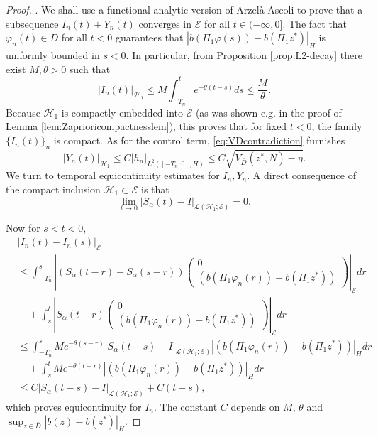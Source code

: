 \documentclass[10pt, reqno]{amsart}
\newcommand{\h}{\mathcal{H}}
\newcommand{\e}{\mathcal{E}}
\theoremstyle{definition}
\numberwithin{lem}{section}
\numberwithin{cor}{section}
\numberwithin{prop}{section}
\numberwithin{thm}{section}
\numberwithin{dfn}{section}
\begin{document}
\begin{proof}
\noindent{\textit{Step 1}: \textit{Pre-compactness in} $C([-T,0];\e)$}. We shall use a functional analytic version of Arzel\`a-Ascoli to prove that a subsequence $I_n(t) + Y_n(t)$ converges in $\e$ for all $t \in (-\infty,0]$.
The fact that $\varphi_n(t) \in \bar{D}$ for all $t <0$ guarantees that $|b(\Pi_1 \varphi(s)) - b(\Pi_1z^*)|_H$ is uniformly bounded in $s<0$. In particular, from Proposition \ref{prop:L2-decay} there exist $M,\theta>0$ such that
\begin{equation*}
    |I_n(t)|_{\h_1} \leq  M\int_{-T_n}^t   e^{-\theta(t-s)} ds \leq \frac{M}{\theta}.
\end{equation*}
Because $\h_1$ is compactly embedded into $\e$ (as was shown e.g. in the proof of Lemma \ref{lem:Zaprioricompactnesslem}), this proves that for fixed $t<0$, the family $\{I_n(t)\}_n$ is compact.
As for the control term, \eqref{eq:VDcontradiction} furnishes
\begin{equation}\label{eq:hnbound}
    |Y_n(t)|_{\h_1} \leq C |h_n|_{L^2([-T_n,0];H)} \leq C \sqrt{V_{\bar{D}}(z^*,N) - \eta}.
\end{equation}
We turn to temporal equicontinuity estimates for $I_n, Y_n.$
A direct consequence of the compact inclusion $\h_1\subset\e$ is that
\begin{equation*}
    \lim_{t \rightarrow 0}|S_\alpha(t) - I|_{\mathscr{L}(\h_1; \e)} = 0.
\end{equation*}

Now for $s<t<0$,
\begin{align*}
    &\left|I_n(t) - I_n(s) \right|_\e \nonumber\\
    &\leq \int_{-T_n}^s \left| (S_\alpha(t-r)-S_\alpha(s-r)) 
    \begin{pmatrix} 0 \\ (b(\Pi_1 \varphi_n(r)) - b(\Pi_1 z^*)) \end{pmatrix}\right|_\e dr \nonumber\\
    &\quad+ \int_{s}^t \left|S_\alpha(t-r) \begin{pmatrix} 0 \\ (b(\Pi_1 \varphi_n(r)) - b(\Pi_1 z^*)) \end{pmatrix}\right|_\e dr\nonumber\\
    &\leq \int_{-T_n}^s M e^{-\theta(s-r)} |S_\alpha(t-s) - I|_{\mathscr{L}(\h_1;\e)} | (b(\Pi_1 \varphi_n(r)) - b(\Pi_1 z^*))|_H dr\nonumber\\
    &\quad+ \int_s^t M e^{-\theta (t-r)} | (b(\Pi_1 \varphi_n(r)) - b(\Pi_1 z^*))|_H dr \nonumber\\
    &\leq C |S_\alpha(t-s) - I|_{\mathscr{L}(\h_1; \e)} + C(t-s),
\end{align*}
which proves equicontinuity for $I_n$. The constant $C$ depends on $M$, $\theta$ and $\sup_{z \in \bar{D}} |b(z) - b(z^*)|_H.$


\end{proof}
\end{document}

